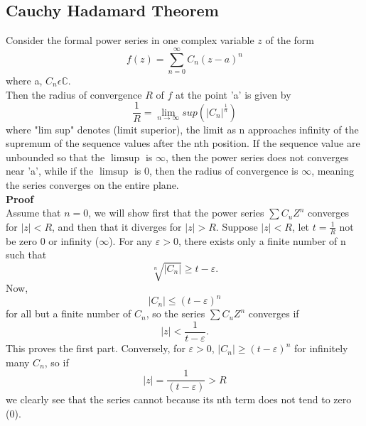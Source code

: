 \documentclass[a4paper, 12pt]{report}
\begin{document}
{\subsection{Cauchy Hadamard Theorem}
Consider the formal power series in one complex variable $z$ of the form
\begin{equation*}
f(z) = \sum^\infty_{n=0}C_n(z - a)^n
\end{equation*}
where a, $C_n \epsilon \mathbb{C}$.\\
Then the radius of convergence $R$ of $f$ at the point 'a' is given by
\begin{equation*}
\frac{1}{R} = \lim_{n\rightarrow\infty}sup(|C_n|^{\frac{1}{n}})
\end{equation*}
where "lim sup" denotes (limit superior), the limit as n approaches infinity of the supremum of the sequence values after the nth position. If the sequence value are unbounded so that the $\limsup$ is $\infty$, then the power series does not converges near 'a', while if the $\limsup$ is 0, then the radius of convergence is $\infty$, meaning the series converges on the entire plane.\\
\textbf{Proof}\\
Assume that $n=0$, we will show first that the power series $\sum C_uZ^n$ converges for $|z| < R$, and then that it diverges for $|z| > R$.
Suppose $|z| < R$, let $t = \frac{1}{R}$ not be zero $0$ or infinity ($\infty$). For any $\varepsilon > 0$, there exists only a finite 
number of n such that
\begin{equation*}
\sqrt[n]{|C_n|} \geq t - \varepsilon.
\end{equation*}
Now,
\begin{equation*}
|C_n| \leq (t - \varepsilon)^n
\end{equation*}
for all but a finite number of $C_n$, so the series $\sum C_uZ^n$ converges if 
\begin{equation*}
|z| < \frac{1}{t - \varepsilon}.
\end{equation*}
This proves the first part.
Conversely, for $\varepsilon > 0$, $|C_n| \geq (t - \varepsilon)^n$ for infinitely many $C_n$, so if 
\begin{equation*}
|z| = \frac{1}{(t - \varepsilon)} > R
\end{equation*}
we clearly see that the series cannot because its nth term does not tend to zero (0).
}
\end{document}
